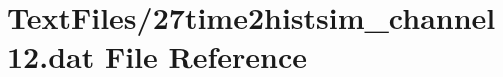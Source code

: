 \hypertarget{27time2histsim__channel12_8dat}{}\section{Text\+Files/27time2histsim\+\_\+channel12.dat File Reference}
\label{27time2histsim__channel12_8dat}
